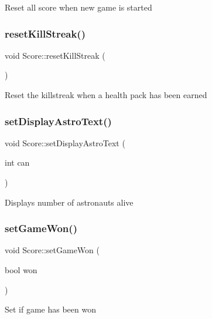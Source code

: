 Reset all score when new game is started \mbox{\label{class_score_a152a46eb1f165db706409369d4da7959}} 
\subsubsection{\texorpdfstring{reset\+Kill\+Streak()}{resetKillStreak()}}
{\footnotesize\ttfamily void Score\+::reset\+Kill\+Streak (\begin{DoxyParamCaption}{ }\end{DoxyParamCaption})}

Reset the killstreak when a health pack has been earned \mbox{\label{class_score_a3b9b2184527917932481449f410ab3ed}} 
\subsubsection{\texorpdfstring{set\+Display\+Astro\+Text()}{setDisplayAstroText()}}
{\footnotesize\ttfamily void Score\+::set\+Display\+Astro\+Text (\begin{DoxyParamCaption}\item[{int}]{can }\end{DoxyParamCaption})}

Displays number of astronauts alive \mbox{\label{class_score_a9d27b67bf0ec19b534a77ea2a2885f3f}} 
\subsubsection{\texorpdfstring{set\+Game\+Won()}{setGameWon()}}
{\footnotesize\ttfamily void Score\+::set\+Game\+Won (\begin{DoxyParamCaption}\item[{bool}]{won }\end{DoxyParamCaption})}

Set if game has been won \mbox{\label{class_score_af0065ea2bf0bf3c1dc92140a1f7e371f}} 
